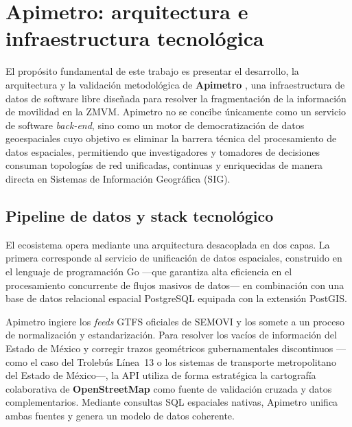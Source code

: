 
\section{Apimetro: arquitectura e infraestructura tecnológica}

El propósito fundamental de este trabajo es presentar el desarrollo, la arquitectura
y la validación metodológica de \textbf{Apimetro}
\citep{garibaldi2025apimetro}, una infraestructura de datos de software libre
diseñada para resolver la fragmentación de la información de movilidad en la ZMVM.
Apimetro no se concibe únicamente como un servicio de software \textit{back-end},
sino como un motor de democratización de datos geoespaciales cuyo objetivo es
eliminar la barrera técnica del procesamiento de datos espaciales, permitiendo que
investigadores y tomadores de decisiones consuman topologías de red unificadas,
continuas y enriquecidas de manera directa en Sistemas de Información Geográfica
(SIG).

\subsection{Pipeline de datos y stack tecnológico}

El ecosistema opera mediante una arquitectura desacoplada en dos capas.  La primera
corresponde al servicio de unificación de datos espaciales, construido en el
lenguaje de programación Go ---que garantiza alta eficiencia en el procesamiento
concurrente de flujos masivos de datos--- en combinación con una base de datos
relacional espacial PostgreSQL equipada con la extensión PostGIS.

Apimetro ingiere los \textit{feeds} GTFS oficiales de SEMOVI y los somete a un
proceso de normalización y estandarización.  Para resolver los vacíos de información
del Estado de México y corregir trazos geométricos gubernamentales discontinuos
---como el caso del Trolebús Línea~13 o los sistemas de transporte metropolitano
del Estado de México---, la API utiliza de forma estratégica la cartografía
colaborativa de \textbf{OpenStreetMap} como fuente de validación cruzada y datos
complementarios.  Mediante consultas SQL espaciales nativas, Apimetro unifica ambas
fuentes y genera un modelo de datos coherente.

